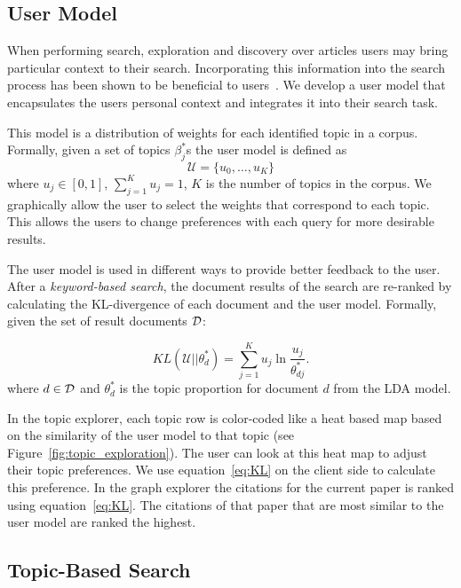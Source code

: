 \subsection{User Model}
When performing search, exploration and discovery over articles 
users may bring particular context to their search. Incorporating 
this information into the search process has been shown to be 
beneficial to users~\cite{DZSRWJ,MZPGSOL}. We develop a user model 
that encapsulates the users personal context and integrates it into 
their search task. 

This model is a distribution of weights for each identified topic in 
a corpus. Formally, given a set of topics $\beta_j^{*}$s the user 
model is defined as
$$
\mathcal{U} = \{u_0, \ldots, u_{K}\}
$$
where $u_j \in [0,1]$, $\sum_{j = 1}^K u_j = 1$, $K$ is the number 
of topics in the corpus.
We graphically allow the user to select the weights that correspond to
each topic. This allows the users to change preferences with each query
for more desirable results.

The user model is used in different ways to provide better feedback to
the user. After a \textsl{keyword-based search}, the document results of the search 
are re-ranked by calculating the KL-divergence of each document and the
user model. Formally, given the set of result documents $\cal D$:

\begin{equation} \label{eq:KL}
KL(\mathcal{U}||\theta^*_{d}) = \sum_{j = 1}^K u_j \ln \frac{u_j}{\theta^*_{dj}}.
\end{equation}
where $d \in {\cal D}$ and $\theta^*_{d}$ is the topic proportion 
for document $d$ from the LDA model. 

In the topic explorer, each topic row is color-coded like a heat 
based map based on the similarity of the user model to that topic (see Figure~\ref{fig:topic_exploration}).
The user can look at this heat map to adjust their topic preferences.
We use equation~\ref{eq:KL} on the client side to calculate this preference. 
In the graph explorer the citations for the current paper is ranked
using equation~\ref{eq:KL}. The citations of that paper that are most
similar to the user model are ranked the highest.


\subsection{Topic-Based Search}

